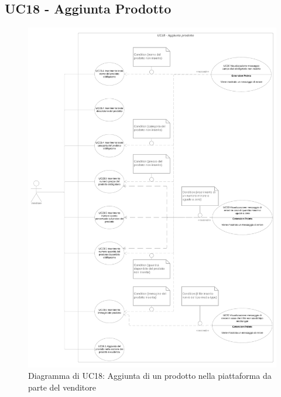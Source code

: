\subsection{UC18 - Aggiunta Prodotto}
\label{UC18}

\begin{figure}[H]
    \centering
    \includegraphics[scale=0.1]{Immagini/DiagrammiUC/UC18AggiuntaProdotto.png}
    \caption{Diagramma di UC18: Aggiunta di un prodotto nella piattaforma da parte del venditore} 
    \label{fig:AggiuntaProdotto}
\end{figure}

